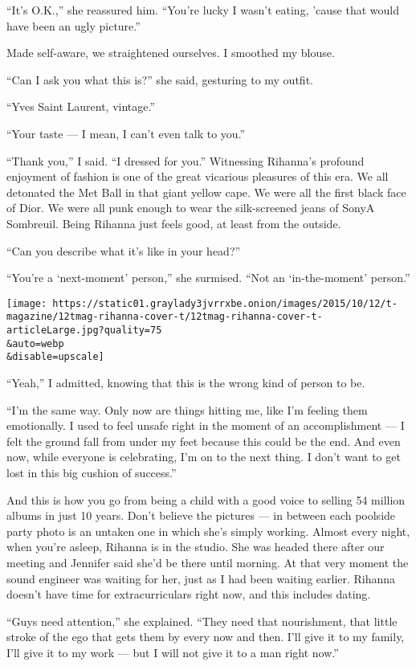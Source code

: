 ``It's O.K.,'' she reassured him. ``You're lucky I wasn't eating, 'cause
that would have been an ugly picture.''

Made self-aware, we straightened ourselves. I smoothed my blouse.

``Can I ask you what this is?'' she said, gesturing to my outfit.

``Yves Saint Laurent, vintage.''

``Your taste --- I mean, I can't even talk to you.''

``Thank you,'' I said. ``I dressed for you.'' Witnessing Rihanna's
profound enjoyment of fashion is one of the great vicarious pleasures of
this era. We all detonated the Met Ball in that giant yellow cape. We
were all the first black face of Dior. We were all punk enough to wear
the silk-screened jeans of SonyA Sombreuil. Being Rihanna just feels
good, at least from the outside.

``Can you describe what it's like in your head?''

``You're a `next-moment' person,'' she surmised. ``Not an
`in-the-moment' person.''

\texttt{[image: https://static01.graylady3jvrrxbe.onion/images/2015/10/12/t-magazine/12tmag-rihanna-cover-t/12tmag-rihanna-cover-t-articleLarge.jpg?quality=75\\\&auto=webp\\\&disable=upscale]}

``Yeah,'' I admitted, knowing that this is the wrong kind of person to
be.

``I'm the same way. Only now are things hitting me, like I'm feeling
them emotionally. I used to feel unsafe right in the moment of an
accomplishment --- I felt the ground fall from under my feet because
this could be the end. And even now, while everyone is celebrating, I'm
on to the next thing. I don't want to get lost in this big cushion of
success.''

And this is how you go from being a child with a good voice to selling
54 million albums in just 10 years. Don't believe the pictures --- in
between each poolside party photo is an untaken one in which she's
simply working. Almost every night, when you're asleep, Rihanna is in
the studio. She was headed there after our meeting and Jennifer said
she'd be there until morning. At that very moment the sound engineer was
waiting for her, just as I had been waiting earlier. Rihanna doesn't
have time for extracurriculars right now, and this includes dating.

``Guys need attention,'' she explained. ``They need that nourishment,
that little stroke of the ego that gets them by every now and then. I'll
give it to my family, I'll give it to my work --- but I will not give it
to a man right now.''


